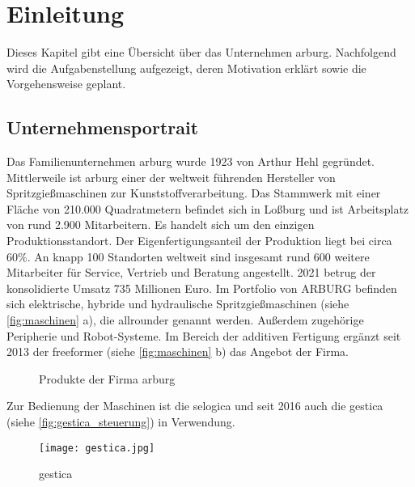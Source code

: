 \chapter{Einleitung}
\label{chap:einleitung}
Dieses Kapitel gibt eine Übersicht über das Unternehmen \gls{arburg}. Nachfolgend wird die Aufgabenstellung aufgezeigt, deren Motivation erklärt sowie die Vorgehensweise geplant. 

\section{Unternehmensportrait}
\label{sec:unternehmen}
Das Familienunternehmen \gls{arburg} wurde 1923 von Arthur Hehl gegründet. Mittlerweile ist \gls{arburg} einer der weltweit führenden Hersteller von Spritzgießmaschinen zur Kunststoffverarbeitung. Das Stammwerk mit einer Fläche von 210.000 Quadratmetern befindet sich in Loßburg und ist Arbeitsplatz von rund 2.900 Mitarbeitern. Es handelt sich um den einzigen Produktionsstandort. Der Eigenfertigungsanteil der Produktion liegt bei circa 60\%. An knapp 100 Standorten weltweit sind insgesamt rund 600 weitere Mitarbeiter für Service, Vertrieb und Beratung angestellt. 2021 betrug der konsolidierte Umsatz 735 Millionen Euro. Im Portfolio von ARBURG befinden sich elektrische, hybride und hydraulische Spritzgießmaschinen (siehe \autoref{fig:maschinen} a), die \gls{allrounder} genannt werden. Außerdem zugehörige Peripherie und Robot-Systeme. Im Bereich der additiven Fertigung ergänzt seit 2013 der \gls{freeformer} (siehe \autoref{fig:maschinen} b) das Angebot der Firma.

\begin{figure}[!htb] 
	\centering
	\qquad
	\caption{Produkte der Firma \gls{arburg} \cite{ARBURGGmbH+CoKG_Mediendatenbank}}%
	\label{fig:maschinen}%
\end{figure}
\FloatBarrier

Zur Bedienung der Maschinen ist die \gls{selogica} und seit 2016 auch die \gls{gestica} (siehe \autoref{fig:gestica_steuerung}) in Verwendung.

\begin{figure}[!htb] 
	\centering
		\texttt{[image: gestica.jpg]}
	\caption{\gls{gestica} \cite{ARBURGGmbH+CoKG_Mediendatenbank}}
	\label{fig:gestica_steuerung}
\end{figure}
\FloatBarrier

